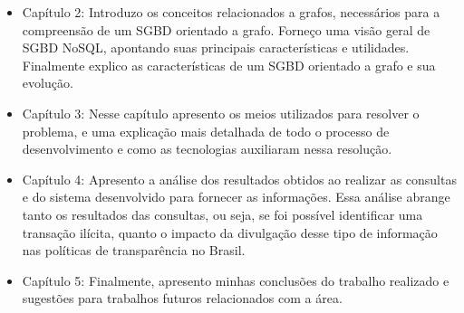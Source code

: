	\begin{itemize}
		\item Capítulo 2: Introduzo os conceitos relacionados a grafos, necessários para a compreensão de um SGBD orientado a grafo. Forneço uma visão geral de SGBD NoSQL, apontando suas principais características e utilidades. Finalmente explico as características de um SGBD orientado a grafo e sua evolução.
		\item Capítulo 3: Nesse capítulo apresento os meios utilizados para resolver o problema, e uma explicação mais detalhada de todo o processo de desenvolvimento e como as tecnologias auxiliaram nessa resolução.
		\item Capítulo 4: Apresento a análise dos resultados obtidos ao realizar as consultas e do sistema desenvolvido para fornecer as informações. Essa análise abrange tanto os resultados das consultas, ou seja, se foi possível identificar uma transação ilícita, quanto o impacto da divulgação desse tipo de informação nas políticas de transparência no Brasil.
		\item Capítulo 5: Finalmente, apresento minhas conclusões do trabalho realizado e sugestões para trabalhos futuros relacionados com a área.
	\end{itemize}